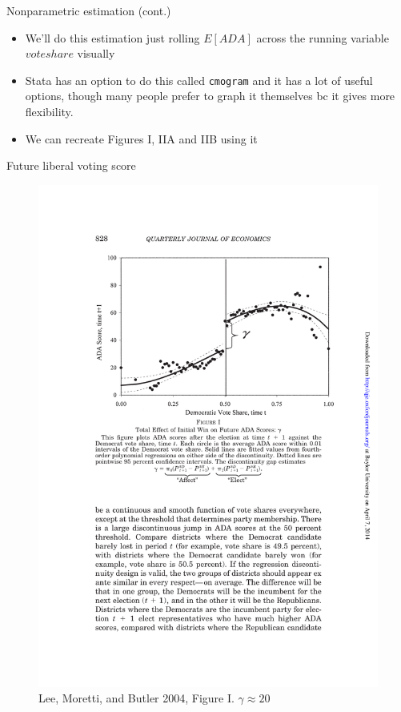 \documentclass{beamer}
\begin{document}
\begin{frame}{Nonparametric estimation (cont.)}

\begin{itemize}
	\item We'll do this estimation just rolling $E[ ADA ]$ across the running variable $voteshare$ visually
	\item Stata has an option to do this called \texttt{cmogram} and it has a lot of useful options, though many people prefer to graph it themselves bc it gives more flexibility.  
	\item We can recreate Figures I, IIA and IIB using it
\end{itemize}
\end{frame}
	


\begin{frame}{Future liberal voting score}
	
	\begin{figure}
	\includegraphics[scale=0.6]{./lecture_includes/lee_fig1.pdf}
	\caption{Lee, Moretti, and Butler 2004, Figure I. $\gamma\approx 20$}
	\end{figure}
\end{frame}
\end{document}
